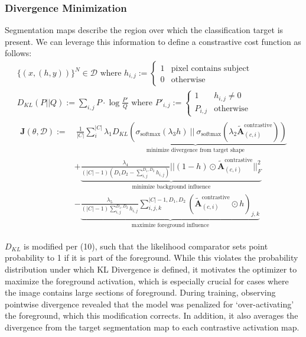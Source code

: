 \documentclass{article}
\theoremstyle{plain}
\theoremstyle{definition}
\theoremstyle{remark}
\newcommand{\contcam}[2]{\tilde{\mathcal{\bm{A}}}^{\text{contrastive}}_{(#1, #2)}}
\begin{document}
\subsubsection{Divergence Minimization}
Segmentation maps describe the region over which the classification target is present. We can leverage this information to define a constrastive cost function as follows:
\begin{gather}
	\{(x, (h, y))\}^N \in \mathcal{D} \text{ where } h_{i,j} := \begin{cases}
		1 & \text{pixel contains subject} \\
		0 & \text{otherwise}
	\end{cases} \\
	D_{KL}(P || Q) := \sum_{i,j} P \cdot \log \frac{P'}{Q} \text{ where } 
	P'_{i,j} := \begin{cases}
		1 & h_{i,j} \neq 0 \\
		P_{i,j} & \text{otherwise}
	\end{cases} \label{d_kl} \\
	\begin{split}
		\mathcal{\bm{J}}(\theta, \mathcal{D}) := &\ \frac{1}{|C|} \sum^{|C|}_{i} \underbrace{\lambda_1 D_{KL}(\sigma_{\text{softmax}}(\lambda_3 h)\ ||\ \sigma_{\text{softmax}}(\lambda_2 \contcam{c}{i}))}_{\text{minimize divergence from target shape}} \\
		&+ \underbrace{\frac{\lambda_4}{(|C| - 1) \left(D_1 D_2 - \sum^{D_1,D_2}_{i,j}h_{i,j}\right)} || (1 - h) \odot \contcam{c}{i}||^2_F}_{\text{minimize background influence}} \\
		&- \underbrace{\frac{\lambda_5}{(|C| - 1) \sum^{D_1,D_2}_{i,j}h_{i,j}} \sum^{|C|-1,D_1,D_2}_{i,j,k} \left(\contcam{c}{i} \odot h\right)_{j,k} }_{\text{maximize foreground influence}}
	\end{split}
\end{gather}

$D_{KL}$ is modified per (10), such that the likelihood comparator sets point probability to 1 if it is part of the foreground. While this violates the probability distribution under which KL Divergence is defined, it motivates the optimizer to maximize the foreground activation, which is especially crucial for cases where the image contains large sections of foreground. During training, observing pointwise divergence revealed that the model was penalized for `over-activating' the foreground, which this modification corrects. In addition, it also averages the divergence from the target segmentation map to each contrastive activation map.
\end{document}
